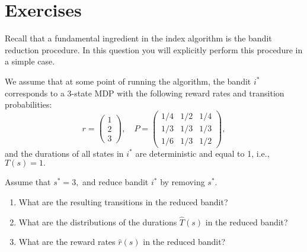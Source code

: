 \section{Exercises}

\begin{exercise}
Recall that a fundamental ingredient in the index algorithm is the bandit reduction procedure. In this question you will explicitly perform this procedure in a simple case.

We assume that at some point of running the algorithm, the bandit ${i^*}$ corresponds to a 3-state MDP with the following reward rates and transition probabilities:
\[r = \left( {\begin{array}{*{20}{c}}
1\\
2\\
3
\end{array}} \right),\quad P = \left( {\begin{array}{*{20}{c}}
{1/4}&{1/2}&{1/4}\\
{1/3}&{1/3}&{1/3}\\
{1/6}&{1/3}&{1/2}
\end{array}} \right),\]
and the durations of all states in ${i^*}$ are deterministic and equal to 1, i.e., $T(s) = 1.$

Assume that ${s^*} = 3,$ and reduce bandit  ${i^*}$ by removing ${s^*}$.
\begin{enumerate}
  \item What are the resulting transitions in the reduced bandit?
  \item What are the distributions of the durations $\hat T(s)$ in the reduced bandit?
  \item What are the reward rates $\hat r(s)$ in the reduced bandit?
\end{enumerate}
\end{exercise}
